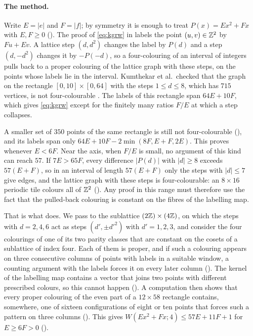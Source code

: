 \documentclass[11pt,colorlinks]{charlie}
\begin{document}
\paragraph{The method.}
Write $E=|e|$ and $F=|f|$; by symmetry it is enough to treat $P(x)=Ex^2+Fx$ with $E,F\ge0$ (). The proof of \eqref{eq:kgrw} in \cite{KGRW} labels the point $(u,v)\in\mathbb{Z}^2$ by $Fu+Ev$. A lattice step $(d,d^2)$ changes the label by $P(d)$ and a step $(d,-d^2)$ changes it by $-P(-d)$, so a four-colouring of an interval of integers pulls back to a proper colouring of the lattice graph with these steps, on the points whose labels lie in the interval. Kumthekar et al.\ checked that the graph on the rectangle $[0,10]\times[0,64]$ with the steps $1\le d\le8$, which has $715$ vertices, is not four-colourable \cite[Lemma~4.1]{KGRW}. The labels of this rectangle span $64E+10F$, which gives \eqref{eq:kgrw} except for the finitely many ratios $F/E$ at which a step collapses.

A smaller set of $350$ points of the same rectangle is still not four-colourable (), and its labels span only $64E+10F-2\min(8F,E+F,2E)$. This proves  whenever $E<6F$. Near the axis, when $F/E$ is small, no argument of this kind can reach $57$. If $7E>65F$, every difference $|P(d)|$ with $|d|\ge8$ exceeds $57(E+F)$, so in an interval of length $57(E+F)$ only the steps with $|d|\le7$ give edges, and the lattice graph with these steps is four-colourable: an $8\times16$ periodic tile colours all of $\mathbb{Z}^2$ (). Any proof in this range must therefore use the fact that the pulled-back colouring is constant on the fibres of the labelling map.

That is what  does. We pass to the sublattice $(2\mathbb{Z})\times(4\mathbb{Z})$, on which the steps with $d=2,4,6$ act as steps $(d',\pm d'^2)$ with $d'=1,2,3$, and consider the four colourings of one of its two parity classes that are constant on the cosets of a sublattice of index four. Each of them is proper, and if such a colouring appears on three consecutive columns of points with labels in a suitable window, a counting argument with the labels forces it on every later column (). The kernel of the labelling map contains a vector that joins two points with different prescribed colours, so this cannot happen (). A computation then shows that every proper colouring of the even part of a $12\times58$ rectangle contains, somewhere, one of sixteen configurations of eight or ten points that forces such a pattern on three columns (). This gives $W(Ex^2+Fx;4)\le57E+11F+1$ for $E\ge6F>0$ ().
\end{document}
